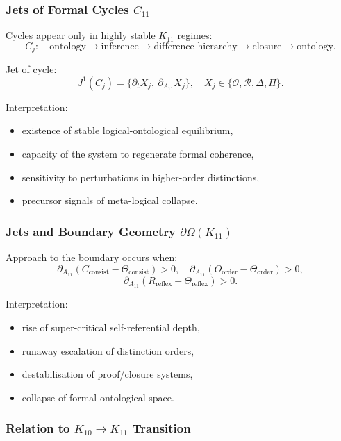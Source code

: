 \subsubsection{Jets of Formal Cycles $C_{11}$}

Cycles appear only in highly stable $K_{11}$ regimes:
\[
C_j:\quad
\text{ontology}
\to\text{inference}
\to\text{difference hierarchy}
\to\text{closure}
\to\text{ontology}.
\]

Jet of cycle:
\[
J^1(C_j)
=
\{\partial_t X_j,\ \partial_{A_{11}}X_j\},
\quad X_j\in
\{\mathcal{O},\mathcal{R},\Delta,\Pi\}.
\]

Interpretation:
\begin{itemize}
    \item existence of stable logical-ontological equilibrium,
    \item capacity of the system to regenerate formal coherence,
    \item sensitivity to perturbations in higher-order distinctions,
    \item precursor signals of meta-logical collapse.
\end{itemize}


\subsubsection{Jets and Boundary Geometry $\partial\Omega(K_{11})$}

Approach to the boundary occurs when:
\[
\partial_{A_{11}}
(C_{\mathrm{consist}}-\Theta_{\mathrm{consist}})>0,
\quad
\partial_{A_{11}}
(O_{\mathrm{order}}-\Theta_{\mathrm{order}})>0,
\]
\[
\partial_{A_{11}}
(R_{\mathrm{reflex}}-\Theta_{\mathrm{reflex}})>0.
\]

Interpretation:
\begin{itemize}
    \item rise of super-critical self-referential depth,
    \item runaway escalation of distinction orders,
    \item destabilisation of proof/closure systems,
    \item collapse of formal ontological space.
\end{itemize}


\subsubsection{Relation to $K_{10} \to K_{11}$ Transition}

